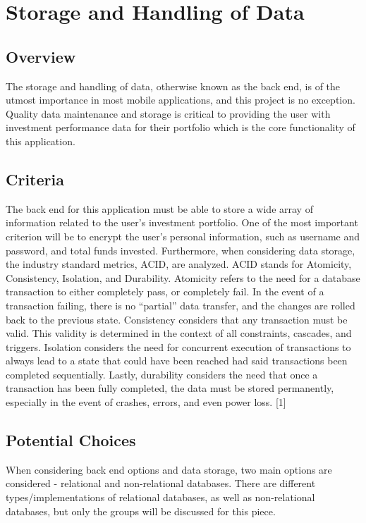\documentclass[onecolumn, draftclsnofoot,10pt, compsoc]{IEEEtran}
\begin{document}
\section{Storage and Handling of Data}

\subsection{Overview}
The storage and handling of data, otherwise known as the back end, is of the utmost importance in most mobile applications, and this project is no exception. Quality data maintenance and storage is critical to providing the user with investment performance data for their portfolio which is the core functionality of this application.

\subsection{Criteria}
The back end for this application must be able to store a wide array of information related to the user's investment portfolio. One of the most important criterion will be to encrypt the user's personal information, such as username and password, and total funds invested. Furthermore, when considering data storage, the industry standard metrics, ACID, are analyzed. ACID stands for Atomicity, Consistency, Isolation, and Durability. Atomicity refers to the need for a database transaction to either completely pass, or completely fail. In the event of a transaction failing, there is no “partial” data transfer, and the changes are rolled back to the previous state. Consistency considers that any transaction must be valid. This validity is determined in the context of all constraints, cascades, and triggers. Isolation considers the need for concurrent execution of transactions to always lead to a state that could have been reached had said transactions been completed sequentially.  Lastly, durability considers the need that once a transaction has been fully completed, the data must be stored permanently, especially in the event of crashes, errors, and even power loss. [1]

\subsection{Potential Choices }
When considering back end options and data storage, two main options are considered - relational and non-relational databases. There are different types/implementations of relational databases, as well as non-relational databases, but only the groups will be discussed for this piece.
\end{document}
